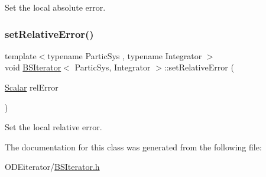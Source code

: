 Set the local absolute error. 

\mbox{\label{class_b_s_iterator_ada9b6cc673e297135646699d581fcdc7}} 
\subsubsection{\texorpdfstring{set\+Relative\+Error()}{setRelativeError()}}
{\footnotesize\ttfamily template$<$typename Partic\+Sys , typename Integrator $>$ \\
void \mbox{\hyperlink{class_b_s_iterator}{B\+S\+Iterator}}$<$ Partic\+Sys, Integrator $>$\+::set\+Relative\+Error (\begin{DoxyParamCaption}\item[{\mbox{\hyperlink{class_b_s_iterator_a44773ad0f46d97005c8e21fa7c155c6f}{Scalar}}}]{rel\+Error }\end{DoxyParamCaption})\hspace{0.3cm}{\ttfamily [inline]}}



Set the local relative error. 



The documentation for this class was generated from the following file\+:\begin{DoxyCompactItemize}
\item 
O\+D\+Eiterator/\mbox{\hyperlink{_b_s_iterator_8h}{B\+S\+Iterator.\+h}}\end{DoxyCompactItemize}
